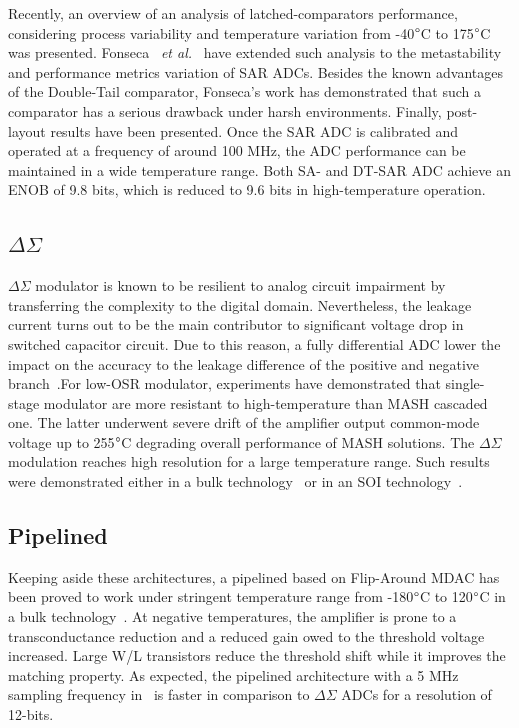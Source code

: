 Recently, an overview of an analysis of latched-comparators performance, considering process variability and temperature variation from -40\(\degree \)C to 175\(\degree \)C was presented. Fonseca ~\textit{et al.}~\cite{Fonseca2018} have extended such analysis to the metastability and performance metrics variation of SAR ADCs. Besides the known advantages of the Double-Tail comparator, Fonseca's work has demonstrated that such a comparator has a serious drawback under harsh environments. Finally, post-layout results have been presented. Once the SAR ADC is calibrated and operated at a frequency of around 100 MHz, the ADC performance can be maintained in a wide temperature range. Both SA- and DT-SAR ADC achieve an ENOB of 9.8 bits, which is reduced to 9.6 bits in high-temperature operation.

\subsection{$\Delta\Sigma$}
\(\Delta\Sigma \) modulator is known to be resilient to analog circuit impairment by transferring the complexity to the digital domain. Nevertheless, the leakage current turns out to be the main contributor to significant voltage drop in switched capacitor circuit. Due to this reason, a fully differential ADC lower the impact on the accuracy to the leakage difference of the positive and negative branch~\cite{Davis2003}.For low-OSR modulator, experiments have demonstrated that single-stage modulator are more resistant to high-temperature than MASH cascaded one. The latter underwent severe drift of the amplifier output common-mode voltage up to 255\(\degree \)C degrading overall performance of MASH solutions. The $\Delta\Sigma$ modulation reaches high resolution for a large temperature range. Such results were demonstrated either in a bulk technology~\cite{Davis2003} or in an SOI technology~\cite{Ericson2004}.

\subsection{Pipelined}
Keeping aside these architectures, a pipelined based on Flip-Around MDAC has been proved to work under stringent temperature range from -180\(\degree \)C to 120\(\degree \)C in a bulk technology~\cite{Yao2010}. At negative temperatures, the amplifier is prone to a transconductance reduction and a reduced gain owed to the threshold voltage increased. Large W/L transistors reduce the threshold shift while it improves the matching property. As expected, the pipelined architecture with a 5 MHz sampling frequency in~\cite{Yao2010} is faster in comparison to $\Delta\Sigma$ ADCs for a resolution of 12-bits.

